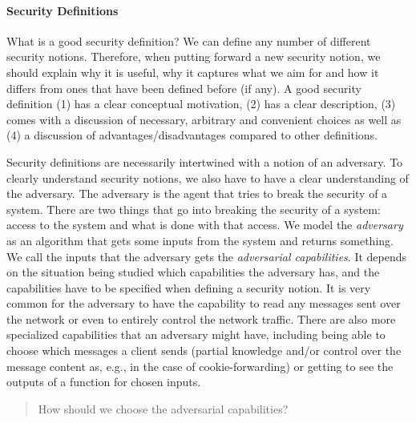 \paragraph{Security Definitions} What is a good security definition? We can define any number of different security notions. Therefore, when putting forward a new security notion, we should explain why it is useful, why it captures what we aim for and how it differs from ones that have been defined before (if any). A good security definition (1) has a clear conceptual motivation, (2) has a clear description, (3) comes with a discussion of necessary, arbitrary and convenient choices as well as (4) a discussion of advantages/disadvantages compared to other definitions.

Security definitions are necessarily intertwined with a notion of an adversary. To clearly understand security notions, we also have to have a clear understanding of the adversary. The adversary is the agent that tries to break the security of a system. There are two things that go into breaking the security of a system: access to the system and what is done with that access. We model the \emph{adversary} as an algorithm that gets some inputs from the system and returns something. We call the inputs that the adversary gets the \emph{adversarial capabilities}. 
It depends on the situation being studied which capabilities the adversary has, and the capabilities have to be specified when defining a security notion. It is very common for the adversary to have the capability to read any messages sent over the network or even to entirely control the network traffic. There are also more specialized capabilities that an adversary might have, including being able to choose which messages a client sends (partial knowledge and/or control over the message content as, e.g., in the case of cookie-forwarding) or getting to see the outputs of a function for chosen inputs.

\begin{quote}
How should we choose the adversarial capabilities?
\end{quote}


